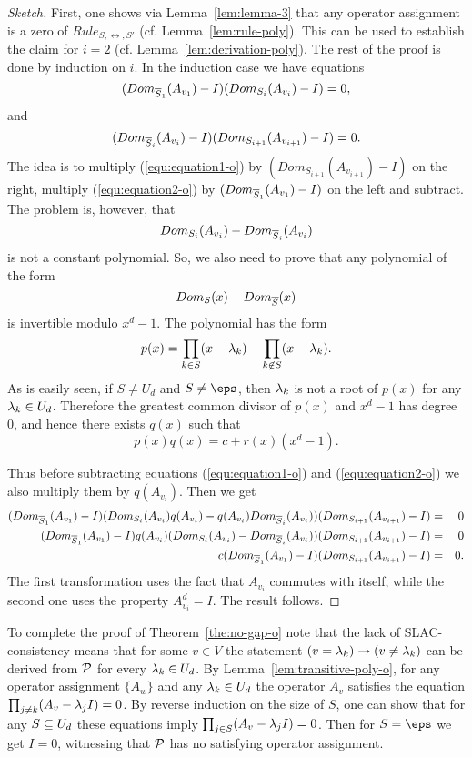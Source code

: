 \begin{proof}[Sketch]
First, one shows via Lemma~\ref{lem:lemma-3} that any operator assignment is a zero of $Rule_{S,\rel,S'}$
(cf. Lemma~\ref{lem:rule-poly}). This can be used to establish the claim for
  $i=2$ (cf. Lemma~\ref{lem:derivation-poly}).
%
The rest of the proof is done by induction on $i$. 
%
In the induction case we have equations
\begin{equation}\label{equ:equation1-o}
(Dom_{\overline S_1}(A_{v_1})-I)(Dom_{S_i}(A_{v_i})-I)=0,
\end{equation}
and 
\begin{equation}\label{equ:equation2-o}
(Dom_{\overline S_i}(A_{v_i})-I)(Dom_{S_{i+1}}(A_{v_{i+1}})-I)=0.
\end{equation}
The idea is to multiply (\ref{equ:equation1-o}) by 
$(Dom_{S_{i+1}}(A_{v_{i+1}})-I)$ on the right, multiply (\ref{equ:equation2-o})
by $(Dom_{\overline S_1}(A_{v_1})-I)$ on the left and subtract. The problem
is, however, that 
\[
Dom_{S_i}(A_{v_i})-Dom_{\overline S_i}(A_{v_i})
\]
is not a constant polynomial. So, we also need to prove that any polynomial
of the form 
\[
Dom_S(x)-Dom_{\overline S}(x)
\]
is invertible modulo $x^d-1$. The polynomial has the form
\[
p(x)=\prod_{k\in S}(x-\lambda_k)-\prod_{k\not\in S}(x-\lambda_k).
\]
As is easily seen, if $S\ne U_d$ and $S\ne\eps$, then $\lambda_k$ is not a
root of $p(x)$ for any $\lambda_k\in U_d$. Therefore the greatest common divisor of $p(x)$ and $x^d-1$ has degree 0, and hence there exists $q(x)$ such that 
\[
p(x)q(x)=c+r(x)(x^d-1).
\]

Thus before subtracting equations (\ref{equ:equation1-o}) and 
(\ref{equ:equation2-o}) we also multiply them by $q(A_{v_i})$. Then we get
\begin{eqnarray*}
(Dom_{\overline S_1}(A_{v_1})-I)(Dom_{S_i}(A_{v_i})q(A_{v_i})
-q(A_{v_i})Dom_{\overline S_i}(A_{v_i}))(Dom_{S_{i+1}}(A_{v_{i+1}})-I) &=& 0\\
(Dom_{\overline S_1}(A_{v_1})-I)q(A_{v_i})(Dom_{S_i}(A_{v_i})
-Dom_{\overline S_i}(A_{v_i}))(Dom_{S_{i+1}}(A_{v_{i+1}})-I) &=& 0\\
c(Dom_{\overline S_1}(A_{v_1})-I)(Dom_{S_{i+1}}(A_{v_{i+1}})-I) &=& 0.
\end{eqnarray*}
The first transformation uses the fact that $A_{v_i}$ commutes with itself, while the 
second one uses the property $A_{v_i}^d=I$.
The result follows.
\end{proof}

To complete the proof of Theorem~\ref{the:no-gap-o} note that the lack of
SLAC-consistency means that for some $v\in V$ the statement 
$(v=\lambda_k)\to(v\ne\lambda_k)$ can be derived from ${\mathcal P}$ for every $\lambda_k\in U_d$.
By Lemma~\ref{lem:transitive-poly-o}, for any operator assignment $\{A_w\}$
and any $\lambda_k\in U_d$ the operator $A_v$ satisfies the equation
$\prod_{j\ne k}(A_v-\lambda_jI)=0$.
By reverse induction on the size of $S$, one can show that for any $S\subseteq U_d$ these equations imply 
$\prod_{j\in S}(A_v-\lambda_jI)=0$.
Then for $S=\eps$ we get $I=0$, witnessing that ${\mathcal P}$ has no satisfying 
operator assignment. 

